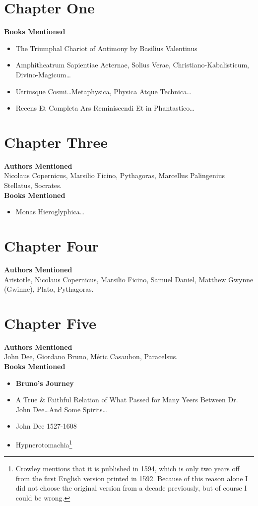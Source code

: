 \documentclass[twoside,10pt]{report}
\begin{document}
\section{Chapter One}
\textbf{Books Mentioned}
\begin{itemize}
\item The Triumphal Chariot of Antimony by Basilius Valentinus \cite{Valentinus.1893}
\item Amphitheatrum Sapientiae Aeternae, Solius Verae, Christiano-Kabalisticum, Divino-Magicum\ldots \cite{Khunrath1609}
\item Utriusque Cosmi\ldots Metaphysica, Physica Atque Technica\ldots \cite{Fludd1617}
\item Recens Et Completa Ars Reminiscendi Et in Phantastico\ldots \cite{Bruno1583}
\end{itemize}

\section{Chapter Three}
\textbf{Authors Mentioned}\\
Nicolaus Copernicus, Marsilio Ficino, Pythagoras, Marcellus Palingenius Stellatus, Socrates.
\\

\textbf{Books Mentioned}
\begin{itemize}
\item Monas Hieroglyphica\ldots \cite{Dee1564}
\end{itemize}

\section{Chapter Four}
\textbf{Authors Mentioned}\\
Aristotle, Nicolaus Copernicus, Marsilio Ficino, Samuel Daniel, Matthew Gwynne (Gwinne), Plato, Pythagoras.

\section{Chapter Five}
\textbf{Authors Mentioned}\\
John Dee, Giordano Bruno, Méric Casaubon, Paracelsus.
\\

\textbf{Books Mentioned}
\begin{itemize}
\item \textbf{Bruno’s Journey} \cite{Craft1931}
\item A True \& Faithful Relation of What Passed for Many Yeers Between Dr. John Dee\ldots And Some
Spirits\ldots \cite{Dee1659}
\item John Dee 1527-1608 \cite{Smith1909}
\item Hypnerotomachia\footnote{Crowley mentions that it is published in 1594, which is only two years off from the first English version printed in 1592. Because of this reason alone I did not choose the original version from a decade previously, but of course I could be wrong.} \cite{Colonna1592}
\end{itemize}
\end{document}
